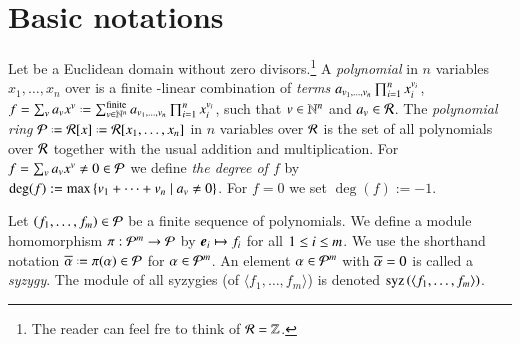\section{Basic notations}
\label{sec:notation}
Let \er be a Euclidean domain without zero divisors.\footnote{The reader can
    feel fre to think of $\mathcal{R} = \mathbb{Z}$.}
A \emph{polynomial}
in $n$ variables $x_1,\ldots,x_n$ over \er is a finite \er-linear
combination of \emph{terms} $a_{v_1,\ldots,v_n} \prod_{i=1}^n
x_i^{v_i}$,
$f=\sum_{v}\const_v x^v \defeq
\sum_{v\in\N^n}^{\text{finite}}\const_{v_1,\ldots,v_n} \prod_{i=1}^n
x_i^{v_i}$,
such that $v \in \mathbb{N}^n$ and $a_v \in \mathcal{R}$.
The \emph{polynomial ring} $\epr \defeq \er[x] \defeq \er[x_1,\ldots,x_n]$
in $n$ variables over $\mathcal{R}$ is the set of all polynomials over $\mathcal{R}$
together with the usual addition and multiplication. For $f=\sum_{v}a_v
x^v \neq 0 \in\mathcal{P}$ we define \emph{the degree of $f$} by $\deg(f) :=
\max\left\{v_1+\cdots +v_n \mid a_v \neq 0\right\}$. For $f=0$ we set
$\deg(f):=
-1$.
%

Let $\left({f}_1,\ldots,{f}_m\right) \in \mathcal{P}$ be a finite sequence of polynomials. We define a module
homomorphism $\pi : \mathcal{P}^m \rightarrow \mathcal{P}$ by $\boldsymbol{e}_{i} \mapsto f_i$ for
all $1\leq i \leq m$. We use the shorthand notation $\proj\alpha
\defeq \pi(\alpha) \in \epr$ for $\alpha \in \mathcal{P}^m$. An element $\alpha \in
\mathcal{P}^m$ with $\overline{\alpha} = 0$ is called a \emph{syzygy}. The module of all
syzygies (of $\langle f_1,\ldots, f_m\rangle$) is denoted $\mathrm{syz}\left({\langle
  f_1,\ldots, f_m\rangle}\right)$.

